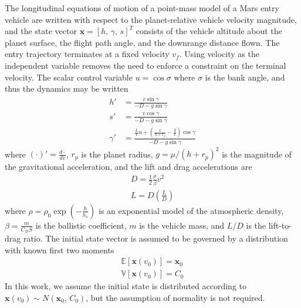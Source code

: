 \documentclass[journal ]{new-aiaa}
\newcommand{\state}{\ensuremath{\mathbf{x}}}
\newcommand{\E}[1]{\mathbb{E}\left[#1\right]}
\newcommand{\V}[1]{\mathbb{V}[#1]}
\newcommand{\cov}{C}
\begin{document}
The longitudinal equations of motion of a point-mass model of a Mars entry vehicle are written with respect to the planet-relative vehicle velocity magnitude, and the state vector $\state=[h,\,\gamma,\, s]^T$ consists of the vehicle altitude about the planet surface, the flight path angle, and the downrange distance flown. The entry trajectory terminates at a fixed velocity $v_f$. Using velocity as the independent variable removes the need to enforce a constraint on the terminal velocity. The scalar control variable $u=\cos\sigma$ where $\sigma$ is the bank angle, and thus the dynamics may be written
\begin{align}
h' &= \frac{v\sin\gamma}{-D - g\sin\gamma} \label{eq_dynamics_altitude}\\
s' &= \frac{v\cos\gamma}{-D - g\sin\gamma} \\
\gamma' &= \frac{\frac{L}{V}u + \left(\frac{v}{h+r_p}-\frac{g}{v}\right)\cos\gamma}{-D - g\sin\gamma} \label{eq_dynamics_fpa}
\end{align}
where $(\cdot)' = \frac{d\cdot}{dv}$, $r_p$ is the planet radius, $g=\mu/(h+r_p)^2$ is the magnitude of the gravitational acceleration, and the lift and drag accelerations are
\begin{align}
D = \frac{1}{2}\frac{\rho}{\beta} v^2 \\
L = D(\frac{L}{D})
\end{align}
where $\rho=\rho_0\exp\left(-\frac{h}{h_s}\right)$ is an exponential model of the atmospheric density, $\beta=\frac{m}{C_DS}$ is the ballistic coefficient, $m$ is the vehicle mass, and $L/D$ is the lift-to-drag ratio.
The initial state vector is assumed to be governed by a distribution with known first two moments
 \begin{align}
 \E{\state(v_0)} = \state_0 \label{eq_ic_mean}\\ 
 \V{\state(v_0)} = \cov_0 \label{eq_ic_cov}
 \end{align}
In this work, we assume the initial state is distributed according to $\state(v_0)\sim N(\state_0,\,\cov_0)$, but the assumption of normality is not required.
\end{document}
